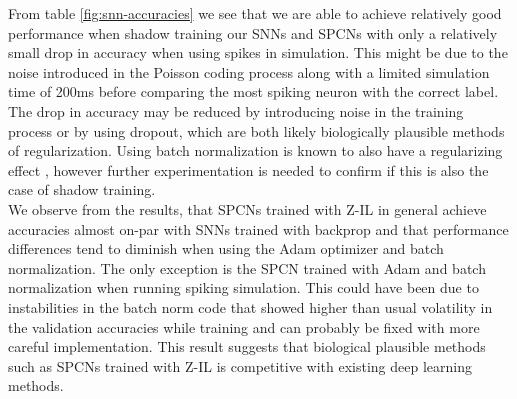 \documentclass[a4paper,11pt]{article}
\begin{document}
From table \ref{fig:snn-accuracies} we see that we are able to achieve relatively good performance when shadow training our SNNs and SPCNs with only a relatively small drop in accuracy when using spikes in simulation. This might be due to the noise introduced in the Poisson coding process along with a limited simulation time of 200ms before comparing the most spiking neuron with the correct label. The drop in accuracy may be reduced by introducing noise in the training process or by using dropout, which are both likely biologically plausible methods of regularization. Using batch normalization is known to also have a regularizing effect \cite{ioffe2015batch}, however further experimentation is needed to confirm if this is also the case of shadow training. \\
We observe from the results, that SPCNs trained with Z-IL in general achieve accuracies almost on-par with SNNs trained with backprop and that performance differences tend to diminish when using the Adam optimizer and batch normalization. The only exception is the SPCN trained with Adam and batch normalization when running spiking simulation. This could have been due to instabilities in the batch norm code that showed higher than usual volatility in the validation accuracies while training and can probably be fixed with more careful implementation. This result suggests that biological plausible methods such as SPCNs trained with Z-IL is competitive with existing deep learning methods. 

\newpage
\end{document}
